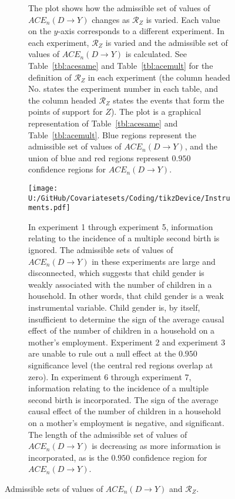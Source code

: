 \documentclass[10pt,a4paper,twoside]{article}
\numberwithin{equation}{section}
\begin{document}
\begin{figure}[p]
\centering
\begin{subfigure}{0.8\textwidth}
\caption{The plot shows how the admissible set of values of $ACE_n(D\rightarrow Y)$ changes as $\mathcal{R}_Z$ is varied. Each value on the $y$-axis corresponds to a different experiment. In each experiment, $\mathcal{R}_Z$ is varied and the admissible set of values of $ACE_n(D\rightarrow Y)$ is calculated. See Table~\ref{tbl:acesame} and Table~\ref{tbl:acemult} for the definition of $\mathcal{R}_Z$ in each experiment (the column headed No. states the experiment number in each table, and the column headed $\mathcal{R}_Z$ states the events that form the points of support for $Z$). The plot is a graphical representation of Table~\ref{tbl:acesame} and Table~\ref{tbl:acemult}. Blue regions represent the admissible set of values of $ACE_n(D\rightarrow Y)$, and the union of blue and red regions represent $0.950$ confidence regions for $ACE_n(D\rightarrow Y)$.}
\texttt{[image: U:/GitHub/Covariatesets/Coding/tikzDevice/Instruments.pdf]}
\caption{In experiment 1 through experiment 5, information relating to the incidence of a multiple second birth is ignored. The admissible sets of values of $ACE_n(D\rightarrow Y)$ in these experiments are large and disconnected, which suggests that child gender is weakly associated with the number of children in a household. In other words, that child gender is a weak instrumental variable. Child gender is, by itself, insufficient to determine the sign of the average causal effect of the number of children in a household on a mother's employment. Experiment 2 and experiment 3 are unable to rule out a null effect at the $0.950$ significance level (the central red regions overlap at zero). In experiment 6 through experiment 7, information relating to the incidence of a multiple second birth is incorporated. The sign of the average causal effect of the number of children in a household on a mother's employment is negative, and significant. The length of the admissible set of values of $ACE_n(D\rightarrow Y)$ is decreasing as more information is incorporated, as is the $0.950$ confidence region for $ACE_n(D\rightarrow Y)$.}
\end{subfigure}
\caption{Admissible sets of values of $ACE_n(D\rightarrow Y)$ and $\mathcal{R}_Z$.}
\end{figure}
\end{document}
